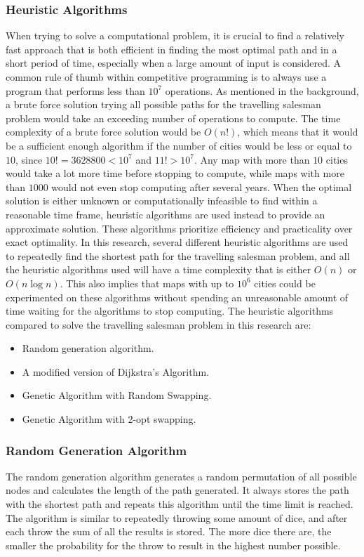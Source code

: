 \documentclass{article}
\begin{document}
\subsubsection{Heuristic Algorithms}\label{Heuristic}
When trying to solve a computational problem, it is crucial to find a relatively fast approach that is both efficient in finding the most optimal path and in a short period of time, especially when a large amount of input is considered. A common rule of thumb within competitive programming is to always use a program that performs less than $10^7$ operations.
\newline
As mentioned in the background, a brute force solution trying all possible paths for the travelling salesman problem would take an exceeding number of operations to compute. The time complexity of a brute force solution would be $O(n!)$, which means that it would be a sufficient enough algorithm if the number of cities would be less or equal to $10$, since $10! = 3628800 < 10^7$ and $11! > 10^7$. Any map with more than $10$ cities would take a lot more time before stopping to compute, while maps with more than $1000$ would not even stop computing after several years.
\newline
When the optimal solution is either unknown or computationally infeasible to find within a reasonable time frame, heuristic algorithms are used instead to provide an approximate solution. These algorithms prioritize efficiency and practicality over exact optimality. In this research, several different heuristic algorithms are used to repeatedly find the shortest path for the travelling salesman problem, and all the heuristic algorithms used will have a time complexity that is either $O(n)$ or $O(n \log{n})$. This also implies that maps with up to $10^6$ cities could be experimented on these algorithms without spending an unreasonable amount of time waiting for the algorithms to stop computing.
\newline
The heuristic algorithms compared to solve the travelling salesman problem in this research are:
\begin{itemize}
  \item Random generation algorithm.
  \item A modified version of Dijkstra's Algorithm.
  \item Genetic Algorithm with Random Swapping.
  \item Genetic Algorithm with 2-opt swapping.
\end{itemize}


\subsubsection{Random Generation Algorithm}\label{Random}
The random generation algorithm generates a random permutation of all possible nodes and calculates the length of the path generated. It always stores the path with the shortest path and repeats this algorithm until the time limit is reached. The algorithm is similar to repeatedly throwing some amount of dice, and after each throw the sum of all the results is stored. The more dice there are, the smaller the probability for the throw to result in the highest number possible.
\end{document}
